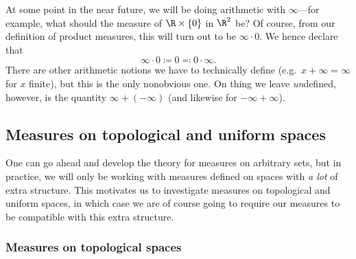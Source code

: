 \begin{displayquote}
At some point in the near future, we will be doing arithmetic with $\infty$---for example, what should the measure of $\R \times \{ 0\}$ in $\R ^2$ be?  Of course, from our definition of product measures, this will turn out to be $\infty \cdot 0$.  We hence declare that
\begin{equation}
\infty \cdot 0\coloneqq 0\eqqcolon 0\cdot \infty .
\end{equation}
There are other arithmetic notions we have to technically define (e.g.~$x+\infty=\infty$ for $x$ finite), but this is the only 						nonobvious one.  On thing we leave \emph{un}defined, however, is the quantity $\infty +(-\infty )$ (and likewise for $-\infty +\infty$).
\end{displayquote}

\subsection{Measures on topological and uniform spaces}

One can go ahead and develop the theory for measures on arbitrary sets, but in practice, we will only be working with measures defined on spaces with \emph{a lot} of extra structure.  This motivates us to investigate measures on topological and uniform spaces, in which case we are of course going to require our measures to be compatible with this extra structure.

\subsubsection{Measures on topological spaces}

